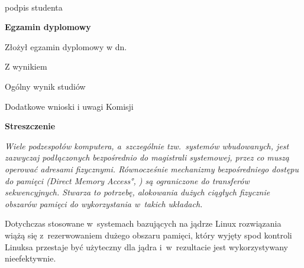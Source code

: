 \begin{titlepage}
    \par
    \vspace{2\baselineskip}
    \hfill\parbox{15em}{{\small\dotfill}\\[-.3ex]
    \centerline{\footnotesize podpis studenta}}\par
    \vspace{3\baselineskip}
    \begin{center}
        {\large\bfseries Egzamin dyplomowy} \par\bigskip\bigskip
    \end{center}
    \par\noindent\vspace{1.5\baselineskip}
    Złożył egzamin dyplomowy w dn. \dotfill
    \par\noindent\vspace{1.5\baselineskip}
    Z wynikiem \dotfill
    \par\noindent\vspace{1.5\baselineskip}
    Ogólny wynik studiów \dotfill
    \par\noindent\vspace{1.5\baselineskip}
    Dodatkowe wnioski i uwagi Komisji \dotfill
    \par\noindent\vspace{1.5\baselineskip}
    \dotfill

    \newpage\thispagestyle{empty}
    \vspace*{2\baselineskip}
    \begin{center}
        {\large\bfseries Streszczenie}\par\bigskip
    \end{center}

    {\itshape Wiele podzespołów komputera, a~szczególnie
      tzw.\ systemów wbudowanych, jest zazwyczaj podłączonych
      bezpośrednio do magistrali systemowej, przez co muszą operować
      adresami fizycznymi.  Równocześnie mechanizmy bezpośredniego
      dostępu do pamięci (\ang{Direct Memory Access}, ) są
      ograniczone do transferów sekwencyjnych.  Stwarza to potrzebę,
      alokowania dużych ciągłych fizycznie obszarów pamięci do
      wykorzystania w~takich układach.

      Dotychczas stosowane w~systemach bazujących na jądrze Linux
      rozwiązania wiążą się z~rezerwowaniem dużego obszaru pamięci,
      który wyjęty spod kontroli Linuksa przestaje być użyteczny dla
      jądra i~w~rezultacie jest wykorzystywany nieefektywnie.

}
\end{titlepage}
